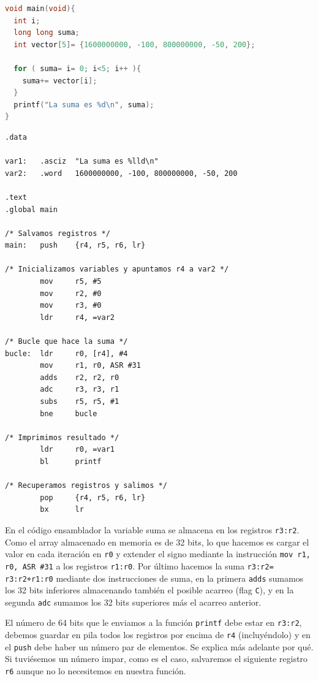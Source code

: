 \begin{lstlisting}[language=C]
void main(void){
  int i;
  long long suma;
  int vector[5]= {1600000000, -100, 800000000, -50, 200};

  for ( suma= i= 0; i<5; i++ ){
    suma+= vector[i];
  }
  printf("La suma es %d\n", suma);
}
\end{lstlisting}

\begin{lstlisting}[caption={Suma de un vector de enteros largos (tipos6.s)},label={lst:dos_11}]
.data

var1:   .asciz  "La suma es %lld\n"
var2:   .word   1600000000, -100, 800000000, -50, 200

.text
.global main

/* Salvamos registros */
main:   push    {r4, r5, r6, lr}

/* Inicializamos variables y apuntamos r4 a var2 */
        mov     r5, #5
        mov     r2, #0
        mov     r3, #0
        ldr     r4, =var2

/* Bucle que hace la suma */
bucle:  ldr     r0, [r4], #4
        mov     r1, r0, ASR #31
        adds    r2, r2, r0
        adc     r3, r3, r1
        subs    r5, r5, #1
        bne     bucle

/* Imprimimos resultado */
        ldr     r0, =var1
        bl      printf

/* Recuperamos registros y salimos */
        pop     {r4, r5, r6, lr}
        bx      lr
\end{lstlisting}

En el código ensamblador la variable suma se almacena en los registros {\tt r3:r2}.
Como el array almacenado en memoria es de 32 bits, lo que hacemos es cargar el valor
en cada iteración en {\tt r0} y extender el signo mediante la instrucción
{\tt mov r1, r0, ASR \#31} a los registros {\tt r1:r0}. Por último hacemos la suma
{\tt r3:r2= r3:r2+r1:r0} mediante dos instrucciones de suma, en la primera {\tt adds}
sumamos los 32 bits inferiores almacenando también el posible acarreo (flag {\tt C}),
y en la segunda {\tt adc} sumamos los 32 bits superiores más el acarreo anterior.

El número de 64 bits que
le enviamos a la función {\tt printf} debe estar en {\tt r3:r2}, debemos guardar en pila
todos los registros por encima de {\tt r4} (incluyéndolo) y en el {\tt push} debe
haber un número par de elementos. Se explica más adelante por qué. Si tuviésemos un número
impar, como es el caso, salvaremos el siguiente registro {\tt r6} aunque no lo
necesitemos en nuestra función.

